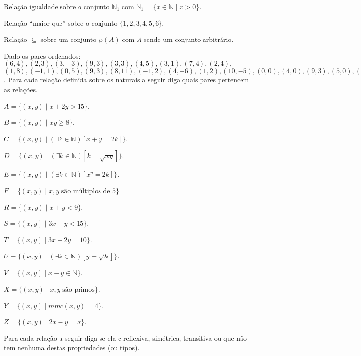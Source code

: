 \begin{exerList}
	\item Relação igualdade sobre o conjunto $\mathbb{N}_1$ com $\mathbb{N}_1 = \{x \in \mathbb{N} \mid x > 0\}$. 
	\item Relação ``maior que'' sobre o conjunto $\{1,2,3,4,5,6\}$.
	\item Relação $\subseteq$ sobre um conjunto $\wp(A)$ com $A$ sendo um conjunto arbitrário.
\end{exerList}

\begin{problem}\label{prob:Relacoes7}
	Dado os pares ordenados: $(6, 4), (2, 3), (3, -3), (9, 3), (3, 3), (4, 5), (3, 1),  (7, 4), (2, 4),$ $(1, 8), (-1, 1), (0, 5), (9, 3), (8, 11), (-1, 2), (4, -6), (1, 2), (10, -5), (0, 0), (4, 0), (9, 3), (5, 0), (0, 1)$. Para cada relação definida sobre os naturais a seguir diga quais pares pertencem as relações.
\end{problem}

\begin{exerList}
	\item $A = \{(x, y) \mid x + 2y > 15\}$.
	\item $B = \{(x, y) \mid xy \geq 8 \}$.
	\item $C = \{(x, y) \mid (\exists k \in \mathbb{N})[x+y = 2k]\}$.
	\item $D = \{(x, y) \mid (\exists k \in \mathbb{N})[k = \sqrt{xy}]\}$.
	\item $E = \{(x, y) \mid (\exists k \in \mathbb{N})[x^y = 2k]\}$.
	\item $F = \{(x, y) \mid x, y \text{ são múltiplos de } 5\}$.
	\item $R = \{(x, y) \mid x + y < 9\}$.
	\item $S = \{(x, y) \mid 3x + y < 15\}$.
	\item $T = \{(x, y) \mid 3x + 2y = 10\}$.
	\item $U = \{(x, y) \mid (\exists k \in \mathbb{N})[y = \sqrt{k}]\}$.
	\item $V = \{(x, y) \mid x - y \in \mathbb{N}\}$.
	\item $X = \{(x, y) \mid x, y \text{ são primos}\}$.
	\item $Y = \{(x, y) \mid mmc(x, y) = 4\}$.
	\item $Z = \{(x, y) \mid 2x - y = x\}$.
\end{exerList}

\begin{problem}\label{prob:Relacoes8}
	Para cada relação a seguir diga se ela é reflexiva, simétrica, transitiva ou que não tem nenhuma destas propriedades (ou tipos).
\end{problem}

